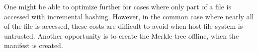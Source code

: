 



One might be able to optimize further for cases where only part of a file is accessed
with incremental hashing.  However, in the common case where nearly all of the file is accessed,
these costs are difficult to avoid when host file system is untrusted.
Another opportunity 
is to create the Merkle tree offline, when the manifest is created.



